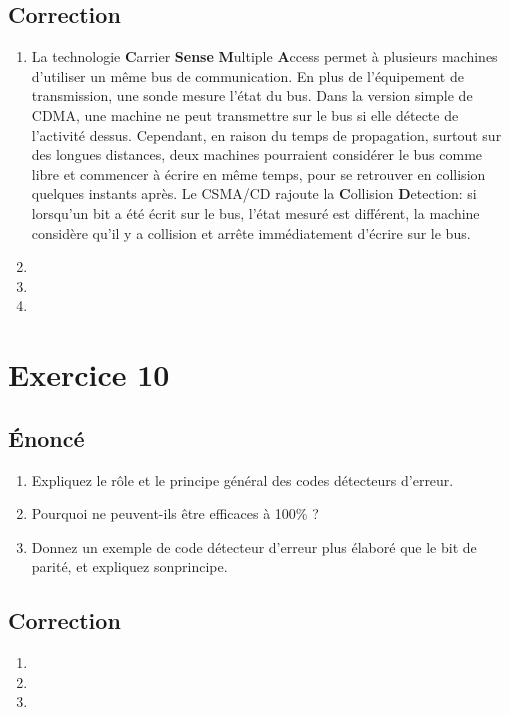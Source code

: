 \documentclass[a4paper, 11pt, titlepage]{article}
\begin{document}
\subsection{Correction}
\begin{enumerate}[label=(\alph*)]
\item La technologie \textbf{C}arrier \textbf{Sense} \textbf{M}ultiple \textbf{A}ccess permet à plusieurs machines d'utiliser un même bus de communication. En plus de l'équipement de transmission, une sonde mesure l'état du bus. Dans la version simple de CDMA, une machine ne peut transmettre sur le bus si elle détecte de l'activité dessus. Cependant, en raison du temps de propagation, surtout sur des longues distances, deux machines pourraient considérer le bus comme libre et commencer à écrire en même temps, pour se retrouver en collision quelques instants après. Le CSMA/CD rajoute la \textbf{C}ollision \textbf{D}etection: si lorsqu'un bit a été écrit sur le bus, l'état mesuré est différent, la machine considère qu'il y a collision et arrête immédiatement d'écrire sur le bus.
\item

\item 

\item 

\end{enumerate}


\section{Exercice 10}
\subsection{\'Enoncé}
\begin{enumerate}[label=(\alph*)]
  \item Expliquez le rôle et le principe général des codes détecteurs d’erreur.
  \item Pourquoi ne peuvent-ils être efficaces à 100\% ?
  \item Donnez un exemple de code détecteur d’erreur plus élaboré que le bit de parité, et expliquez sonprincipe.
\end{enumerate}

\subsection{Correction}
\begin{enumerate}[label=(\alph*)]
\item

\item

\item

\end{enumerate}
\end{document}
